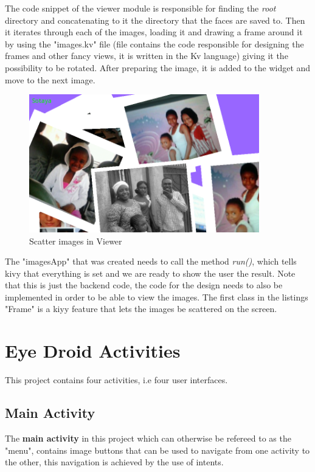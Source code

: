 The code snippet of the viewer module is responsible for finding the {\it root} directory and concatenating to it the directory that the faces are saved to. Then it iterates through each of the images, loading it and drawing a frame around it by using the "images.kv" file (file contains the code responsible for designing the frames and other fancy views, it is written in the Kv language) giving it the possibility to be rotated. After preparing the image, it is added to the widget and move to the next image. 

\begin{figure}[ht!]
\centering
\includegraphics[width=100mm]{viewer.png}
\caption{Scatter images in Viewer}
\label{overflow}
\end{figure}    

The "imagesApp" that was created needs to  call the method {\it run()}, which tells kivy that everything is set and we are ready to show the user the result. Note that this is just the backend code, the code for the design needs to also be implemented in order to be able to view the images. The first class in the listings "Frame" is a kiyy feature that lets the images be scattered on the screen.

\section{Eye Droid Activities}
This project contains four activities, i.e four user interfaces.

\subsection{Main Activity}
The {\bf main activity} in this project which can otherwise be refereed to as the "menu", contains image buttons that can be used to navigate from one activity to the other, this navigation is achieved by the use of intents.

